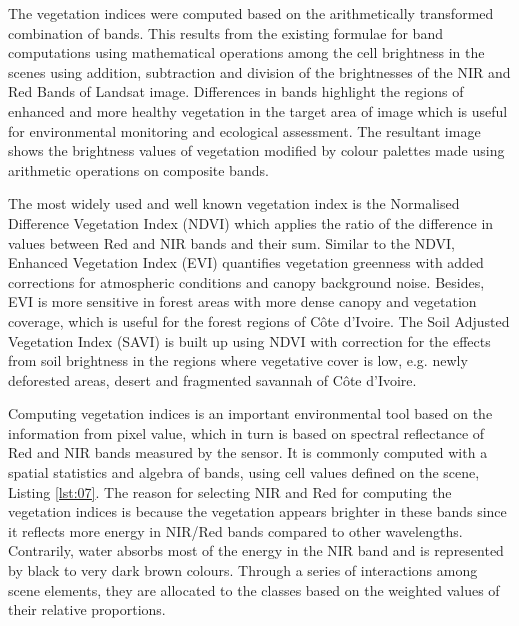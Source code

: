 \documentclass[algorithms,article,submit,pdftex,moreauthors]{Definitions/mdpi}
\begin{document}
The vegetation indices were computed based on the arithmetically transformed combination of bands. This results from the existing formulae for band computations using mathematical operations among the cell brightness in the scenes using addition, subtraction and division of the brightnesses of the NIR and Red Bands of Landsat image. Differences in bands highlight the regions of enhanced and more healthy vegetation in the target area of image which is useful for environmental monitoring and ecological assessment. The resultant image shows the brightness values of vegetation modified by colour palettes made using arithmetic operations on composite bands. 

The most widely used and well known vegetation index is the Normalised Difference Vegetation Index (NDVI) which applies the ratio of the difference in values between Red and NIR bands and their sum. Similar to the NDVI, Enhanced Vegetation Index (EVI) quantifies vegetation greenness with added corrections for atmospheric conditions and canopy background noise. Besides, EVI is more sensitive in forest areas with more dense canopy and vegetation coverage, which is useful for the forest regions of Côte d'Ivoire. The Soil Adjusted Vegetation Index (SAVI) is built up using NDVI with correction for the effects from soil brightness in the regions where vegetative cover is low, e.g. newly deforested areas, desert and fragmented savannah of Côte d'Ivoire. 

Computing vegetation indices is an important environmental tool based on the information from pixel value, which in turn is based on spectral reflectance of Red and NIR bands measured by the sensor. It is commonly computed with a spatial statistics and algebra of bands, using cell values defined on the scene, Listing \ref{lst:07}. The reason for selecting NIR and Red for computing the vegetation indices is because the vegetation appears brighter in these bands since it reflects more energy in NIR/Red bands compared to other wavelengths. Contrarily, water absorbs most of the energy in the NIR band and is represented by black to very dark brown colours. Through a series of interactions among scene elements, they are allocated to the classes based on the weighted values of their relative proportions.
\end{document}
